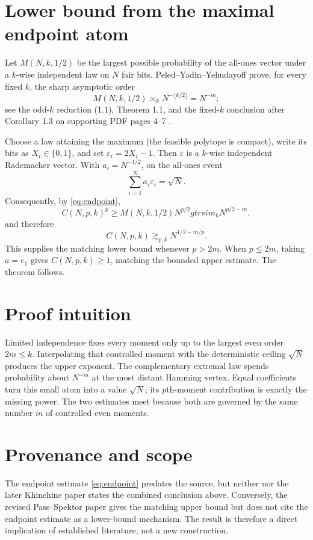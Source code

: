 \documentclass[11pt]{article}
\begin{document}
\section*{Lower bound from the maximal endpoint atom}
Let $M(N,k,1/2)$ be the largest possible probability of the all-ones vector under a $k$-wise independent law on $N$ fair bits.  Peled--Yadin--Yehudayoff prove, for every fixed $k$, the sharp asymptotic order
\begin{equation}\label{eq:endpoint}
 M(N,k,1/2)\asymp_k N^{-\lfloor k/2\rfloor}=N^{-m};
\end{equation}
see the odd-$k$ reduction (1.1), Theorem 1.1, and the fixed-$k$ conclusion after Corollary 1.3 on supporting PDF pages 4--7 \cite{PYY}.

Choose a law attaining the maximum (the feasible polytope is compact), write its bits as $X_i\in\{0,1\}$, and set $\varepsilon_i=2X_i-1$.  Then $\varepsilon$ is a $k$-wise independent Rademacher vector.  With $a_i=N^{-1/2}$, on the all-ones event
\[
 \sum_{i=1}^N a_i\varepsilon_i=\sqrt N.
\]
Consequently, by \eqref{eq:endpoint},
\[
 C(N,p,k)^p\ge M(N,k,1/2)N^{p/2}gtrsim_k N^{p/2-m},
\]
and therefore
\[
 C(N,p,k)\gtrsim_{p,k}N^{1/2-m/p}.
\]
This supplies the matching lower bound whenever $p>2m$.  When $p\le2m$, taking $a=e_1$ gives $C(N,p,k)\ge1$, matching the bounded upper estimate.  The theorem follows.

\section*{Proof intuition}
Limited independence fixes every moment only up to the largest even order $2m\le k$.  Interpolating that controlled moment with the deterministic ceiling $\sqrt N$ produces the upper exponent.  The complementary extremal law spends probability about $N^{-m}$ at the most distant Hamming vertex.  Equal coefficients turn this small atom into a value $\sqrt N$; its $p$th-moment contribution is exactly the missing power.  The two estimates meet because both are governed by the same number $m$ of controlled even moments.

\section*{Provenance and scope}
The endpoint estimate \eqref{eq:endpoint} predates the source, but neither \cite{PYY} nor the later Khinchine paper states the combined conclusion above.  Conversely, the revised Pass--Spektor paper gives the matching upper bound but does not cite the endpoint estimate as a lower-bound mechanism.  The result is therefore a direct implication of established literature, not a new construction.
\end{document}

